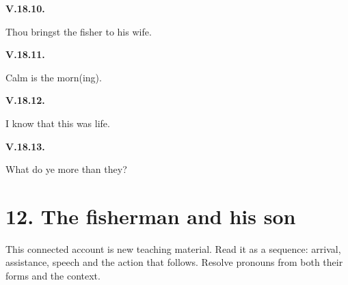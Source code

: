 \par\begin{minipage}{\linewidth}\raggedright
\textbf{V.18.10.}

Thou bringst the fisher to his wife.

\end{minipage}\par\addvspace{4pt}

\par\begin{minipage}{\linewidth}\raggedright
\textbf{V.18.11.}

Calm is the morn(ing).

\end{minipage}\par\addvspace{4pt}

\par\begin{minipage}{\linewidth}\raggedright
\textbf{V.18.12.}

I know that this was life.

\end{minipage}\par\addvspace{4pt}

\par\begin{minipage}{\linewidth}\raggedright
\textbf{V.18.13.}

What do ye more than they?

\end{minipage}\par\addvspace{4pt}

\section*{12. The fisherman and his son}

This connected account is new teaching material. Read it as a sequence: arrival, assistance, speech and the action that follows. Resolve pronouns from both their forms and the context.

